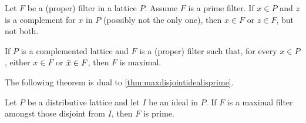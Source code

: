 \begin{propoPrimeFilterIsMax}\label{thm:primefilterismax}
	Let $F$ be a (proper) filter in a lattice $P$. Assume $F$ is a prime
	filter. If $x\in P$ and $z$ is a complement for $x$ in $P$ (possibly
	not the only one), then $x\in F$ or $z\in F$, but not both.

	If $P$ is a complemented lattice and $F$ is a (proper) filter such
	that, for every $x\in P$, either $x\in F$ or $\bar{x}\in F$, then
	$F$ is maximal.
\end{propoPrimeFilterIsMax}

The following theorem is dual to \ref{thm:maxdisjointidealisprime}.

\begin{thmMaxDisjointFilterIsPrime}\label{thm:maxdisjointfilterisprime}
	Let $P$ be a distributive lattice and let $I$ be an ideal in $P$.
	If $F$ is a maximal filter amongst those disjoint from $I$, then
	$F$ is prime.
\end{thmMaxDisjointFilterIsPrime}

